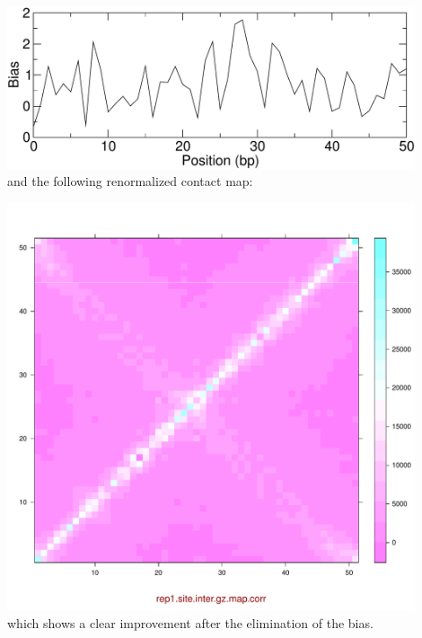 \documentclass[12pt,a4paper,notitlepage]{article}
\begin{document}
\vspace{.5cm}\hspace{2cm}\includegraphics[page=1,width=12cm]{caulobacter/biascaulo}\\
and the following renormalized contact map:

\vspace{.5cm}\hspace{2cm}\includegraphics[page=4,width=12cm]{caulobacter/corr}\\
which shows a clear improvement after the elimination of the bias.

{}

\end{document}
